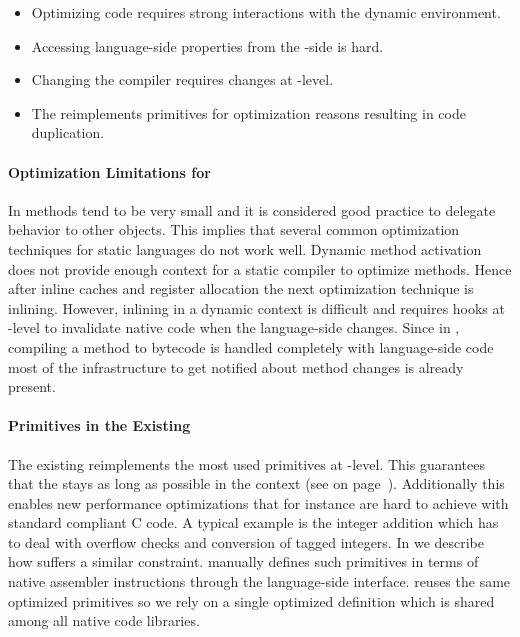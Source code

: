 \begin{itemize}
	\item Optimizing \ST code requires strong interactions with the dynamic environment.
	\item Accessing language-side properties from the \VM-side is hard.
	\item Changing the \JIT compiler requires changes at \VM-level.
	\item The \JIT reimplements primitives for optimization reasons resulting in code duplication.
\end{itemize}

\paragraph{Optimization Limitations for \PH}
In \ST methods tend to be very small and it is considered good practice to delegate behavior to other objects.
This implies that several common optimization techniques for static languages do not work well.
Dynamic method activation does not provide enough context for a static compiler to optimize methods.
Hence after inline caches and register allocation the next optimization technique is inlining.
However, inlining in a dynamic context is difficult and requires hooks at \VM-level to invalidate native code when the language-side changes.
Since in \PH, compiling a method to bytecode is handled completely with language-side code most of the infrastructure to get notified about method changes is already present.

\paragraph{Primitives in the Existing \JIT}
The existing \JIT reimplements the most used primitives at \VM-level.
This guarantees that the \VM stays as long as possible in the \JIT context (see  on page~\pageref{sec:benzo-jit-interaction}).
Additionally this enables new performance optimizations that for instance are hard to achieve with standard compliant C code.
A typical example is the integer addition which has to deal with overflow checks and conversion of tagged integers.
In  we describe how \WF suffers a similar constraint.
\WF manually defines such primitives in terms of native assembler instructions through the language-side \B interface.
\NBJ reuses the same optimized primitives so we rely on a single optimized definition which is shared among all native code libraries.

